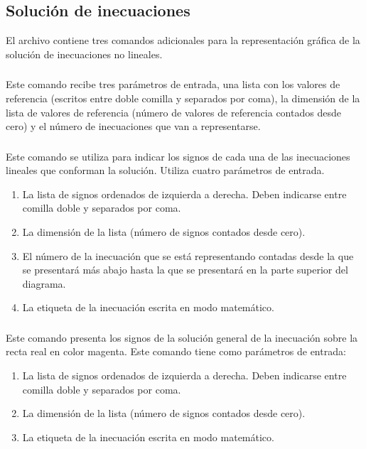 \documentclass[10pt,a4paper]{article}
\begin{document}
\begin{tikzPlusCode}
\end{tikzPlusCode}

\subsection{Solución de inecuaciones} El archivo  contiene tres comandos adicionales para la representación gráfica de la solución de inecuaciones no lineales.

\subsubsection{} Este comando recibe tres parámetros de entrada, una lista con los valores de referencia (escritos entre doble comilla y separados por coma), la dimensión de la lista de valores de referencia (número de valores de referencia contados desde cero) y el número de inecuaciones que van a representarse.

\subsubsection{} Este comando se utiliza para indicar los signos de cada una de las inecuaciones lineales que conforman la solución. Utiliza cuatro parámetros de entrada.
  \begin{enumerate}
    \item La lista de signos ordenados de izquierda a derecha. Deben indicarse entre comilla doble y separados por coma.
    \item La dimensión de la lista (número de signos contados desde cero).
    \item El número de la inecuación que se está representando contadas desde la que se presentará más abajo hasta la que se presentará en la parte superior del diagrama.
    \item La etiqueta de la inecuación escrita en modo matemático.
  \end{enumerate}

\subsubsection{} Este comando presenta los signos de la solución general de la inecuación sobre la recta real en color magenta. Este comando tiene como parámetros de entrada:
  \begin{enumerate}
    \item La lista de signos ordenados de izquierda a derecha. Deben indicarse entre comilla doble y separados por coma.
    \item La dimensión de la lista (número de signos contados desde cero).
    \item La etiqueta de la inecuación escrita en modo matemático.
  \end{enumerate}
\end{document}

